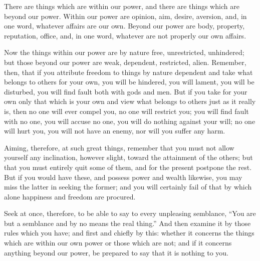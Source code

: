 There are things which are within our power, and there are things which
are beyond our power. Within our power are opinion, aim, desire,
aversion, and, in one word, whatever affairs are our own. Beyond our
power are body, property, reputation, office, and, in one word, whatever
are not properly our own affairs.

Now the things within our power are by nature free, unrestricted,
unhindered; but those beyond our power are weak, dependent, restricted,
alien. Remember, then, that if you attribute freedom to things by nature
dependent and take what belongs to others for your own, you will be
hindered, you will lament, you will be disturbed, you will find fault
both with gods and men. But if you take for your own only that which is
your own and view what belongs to others just as it really is, then no
one will ever compel you, no one will restrict you; you will find fault
with no one, you will accuse no one, you will do nothing against your
will; no one will hurt you, you will not have an enemy, nor will you
suffer any harm.

Aiming, therefore, at such great things, remember that you must not allow
yourself any inclination, however slight, toward the attainment of the
others; but that you must entirely quit some of them, and for the present
postpone the rest. But if you would have these, and possess power and
wealth likewise, you may miss the latter in seeking the former; and you
will certainly fail of that by which alone happiness and freedom are
procured.

Seek at once, therefore, to be able to say to every unpleasing semblance,
``You are but a semblance and by no means the real thing.'' And then
examine it by those rules which you have; and first and chiefly by this:
whether it concerns the things which are within our own power or those
which are not; and if it concerns anything beyond our power, be prepared
to say that it is nothing to you.
